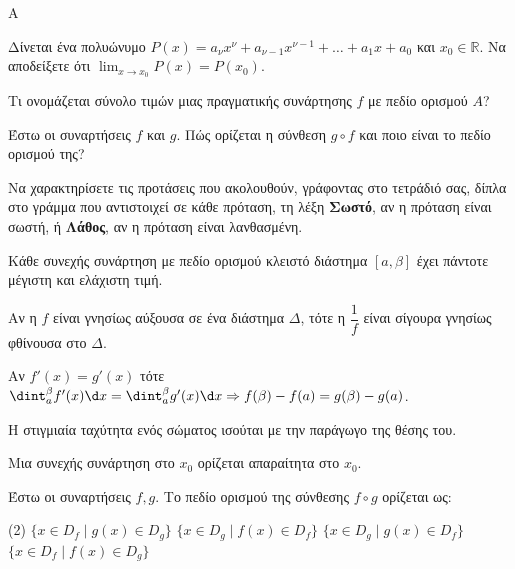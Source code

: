\begin{thema}{A}
\begin{erwthma}
    \item Δίνεται ένα πολυώνυμο $ P(x)=a_\nu x^\nu+a_{\nu-1}x^{\nu-1}+\ldots+a_1x+a_0 $ και $ x_0\in\mathbb{R} $. Να αποδείξετε ότι $ {\displaystyle{\lim_{x\to x_0}{P(x)}=P(x_0)}} $.
    \item Τι ονομάζεται σύνολο τιμών μιας πραγματικής συνάρτησης $f$ με πεδίο ορισμού $A$?
    \item Έστω οι συναρτήσεις $f$ και $g$. Πώς ορίζεται η σύνθεση $g \circ f$ και ποιο είναι το πεδίο ορισμού της?
    \item Να χαρακτηρίσετε τις προτάσεις που ακολουθούν, γράφοντας στο τετράδιό σας, δίπλα στο γράμμα που αντιστοιχεί σε κάθε πρόταση, τη λέξη \textbf{Σωστό}, αν η πρόταση είναι σωστή, ή \textbf{Λάθος}, αν η πρόταση είναι λανθασμένη.
    \begin{alist}
        \item Κάθε συνεχής συνάρτηση με πεδίο ορισμού κλειστό διάστημα $[a, \beta]$ έχει πάντοτε μέγιστη και ελάχιστη τιμή.
        \item Αν η $f$ είναι γνησίως αύξουσα σε ένα διάστημα $\Delta$, τότε η $\dfrac{1}{f}$ είναι σίγουρα γνησίως φθίνουσα στο $\Delta$.
        \item Αν $f'(x) = g'(x)$ τότε $\dint_a^\beta f'(x)\d x = \dint_a^\beta g'(x)\d x \Rightarrow f(\beta)-f(a) = g(\beta)-g(a)$.
        \item Η στιγμιαία ταχύτητα ενός σώματος ισούται με την παράγωγο της θέσης του.
        \item Μια συνεχής συνάρτηση στο $x_0$ ορίζεται απαραίτητα στο $x_0$.
    \end{alist}
    \item Έστω οι συναρτήσεις $f, g$. Το πεδίο ορισμού της σύνθεσης $f \circ g$ ορίζεται ως:
    \begin{tasks}[label=\let\textdexiakeraia\relax\alph*.](2)
        \task $\big\{x \in D_f \mid g(x) \in D_g\big\}$
        \task $\big\{x \in D_g \mid f(x) \in D_f\big\}$
        \task $\big\{x \in D_g \mid g(x) \in D_f\big\}$
        \task $\big\{x \in D_f \mid f(x) \in D_g\big\}$
    \end{tasks}
\end{erwthma}
\end{thema}



